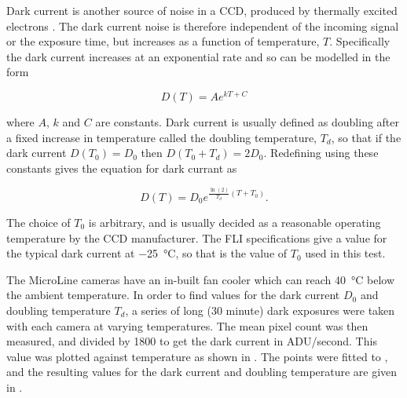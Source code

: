 \begin{colsection}
\begin{colsection}
Dark current is another source of noise in a CCD, produced by thermally excited electrons \citep{dark_current}. The dark current noise is therefore independent of the incoming signal or the exposure time, but increases as a function of temperature, $T$. Specifically the dark current increases at an exponential rate and so can be modelled in the form

\begin{equation}
    D(T) = Ae^{kT + C}
    \label{eq:dark_model}
\end{equation}

where $A$, $k$ and $C$ are constants. Dark current is usually defined as doubling after a fixed increase in temperature called the doubling temperature, $T_d$, so that if the dark current $D(T_0) = D_0$ then $D(T_0 + T_d) = 2D_0$. Redefining  using these constants gives the equation for dark currant as

\begin{equation}
    D(T) = D_0 e^{\frac{\ln(2)}{T_d}(T + T_0)}.
    \label{eq:dc}
\end{equation}

The choice of $T_0$ is arbitrary, and is usually decided as a reasonable operating temperature by the CCD manufacturer. The FLI specifications give a value for the typical dark current at \SI{-25}{\celsius}, so that is the value of $T_0$ used in this test.

The MicroLine cameras have an in-built fan cooler which can reach \SI{40}{\celsius} below the ambient temperature. In order to find values for the dark current $D_0$ and doubling temperature $T_d$, a series of long (30 minute) dark exposures were taken with each camera at varying temperatures. The mean pixel count was then measured, and divided by 1800 to get the dark current in ADU/second. This value was plotted against temperature as shown in . The points were fitted to , and the resulting values for the dark current and doubling temperature are given in .


\end{colsection}
\end{colsection}
